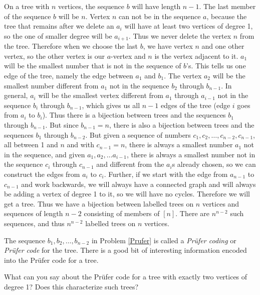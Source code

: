 {On a tree with $n$ vertices, the sequence $b$ will have length $n-1$.  The
last member of the sequence $b$ will be $n$.  Vertex $n$ can not be in the
sequence $a$, because the tree that remains after we delete an $a_i$ will have
at least two vertices of degree 1, so the one of smaller degree will be
$a_{i+1}$.  Thus we never delete the vertex $n$ from the tree.  Therefore when
we choose the last $b$, we have vertex $n$ and one other vertex, so the other
vertex is our $a$-vertex and $n$ is the vertex adjacent to it.  $a_1$ will be
the smallest number that is not in the sequence of $b$'s.  This tells us one
edge of the tree, namely the edge between $a_1$ and $b_1$.  The vertex $a_2$
will be the smallest number different from $a_1$ not in the sequence $b_2$
through
$b_{n-1}$. 
 In general, $a_i$
will be the smallest vertex different from $a_1$ through $a_{i-1}$ not in the
sequence
$b_i$ through
$b_{n-1}$, which gives us all $n-1$ edges of the tree (edge $i$ goes from
$a_i$ to
$b_i$).  Thus there is a bijection between trees and the sequences $b_1$
through $b_{n-1}$. But since $b_{n-1}=n$, there is also a bijection between
trees and the sequences $b_1$ through $b_{n-2}$.  But given a sequence of
numbers $c_1,c_2,\ldots,c_{n-2},c_{n-1}$, all between 1 and $n$ and with
$c_{n-1}=n$, there is always a smallest number $a_1$ not in the sequence, and
given
$a_1,
a_2, \ldots a_{i-1}$, there is always a smallest number 
not in the sequence $c_i$ through $c_{n-1}$ and different from the $a_i$s
already chosen, so we can construct the edges from $a_i$ to $c_i$.  Further,
if we start with the edge from $a_{n-1}$ to $c_{n-1}$ and work backwards, we
will always have a connected graph and will always be adding a vertex of
degree 1 to it, so we will have no cycles.  Therefore we will get  a tree. 
Thus we have a bijection between labelled trees on $n$ vertices and sequences
of length $n-2$ consisting of members of $[n]$.  There are $n^{n-2}$ such
sequences, and thus $n^{n-2}$ labelled trees on $n$ vertices.}

\ep
The sequence $b_1,b_2,\ldots, b_{n-2}$ in Problem \ref{Prufer} is called a
{\em Pr\"ufer coding} or {\em Pr\"ufer code} for the tree.  There is a good bit
of interesting information encoded into the Pr\"ufer code for a tree.

\bp
\item What can you say about the Pr\"ufer code for a tree with exactly
two vertices of degree 1? Does this characterize such trees? 

